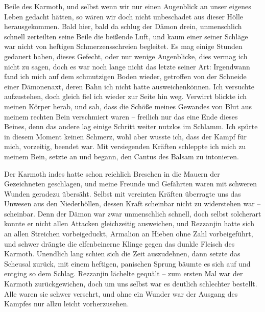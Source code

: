 Beile des Karmoth, und selbst wenn wir nur einen Augenblick an unser eigenes Leben gedacht hätten, so wären wir doch nicht unbeschadet aus dieser Hölle herausgekommen. Bald hier, bald da schlug der Dämon drein, unmenschlich schnell zerteilten seine Beile die beißende Luft, und kaum einer seiner Schläge war nicht von heftigen Schmerzensschreien begleitet. Es mag einige Stunden gedauert haben, dieses Gefecht, oder nur wenige Augenblicke, dies vermag ich nicht zu sagen, doch es war noch lange nicht das letzte seiner Art: Irgendwann fand ich mich auf dem schmutzigen Boden wieder, getroffen von der Schneide einer Dämonenaxt, deren Bahn ich nicht hatte ausweichenkönnen. Ich versuchte aufzustehen, doch gleich fiel ich wieder zur Seite hin weg. Verwirrt blickte ich meinen Körper herab, und sah, dass die Schöße meines Gewandes von Blut aus meinem rechten Bein verschmiert waren -- freilich nur das eine Ende dieses Beines, denn das andere lag einige Schritt weiter nutzlos im Schlamm. Ich spürte in diesem Moment keinen Schmerz, wohl aber wusste ich, dass der Kampf für mich, vorzeitig, beendet war. Mit versiegenden Kräften schleppte ich mich zu meinem Bein, setzte an und begann, den Cantus des Balsam zu intonieren.

Der Karmoth indes hatte schon reichlich Breschen in die Mauern der Gezeichneten geschlagen, und meine Freunde und Gefährten waren mit schweren Wunden geradezu übersäht. Selbst mit vereinten Kräften überragte uns das Unwesen aus den Niederhöllen, dessen Kraft scheinbar nicht zu widerstehen war -- scheinbar. Denn der Dämon war zwar unmenschlich schnell, doch selbst solcherart konnte er nicht allen Attacken gleichzeitig ausweichen, und Rezzanjin hatte sich an allen Streichen vorbeigeduckt, Armalion an Hieben ohne Zahl vorbeigeführt, und schwer drängte die elfenbeinerne Klinge gegen das dunkle Fleisch des Karmoth. Unendlich lang schien sich die Zeit auszudehnen, dann setzte das Scheusal zurück, mit einem heftigen, panischen Sprung bäumte es sich auf und entging so dem Schlag. Rezzanjin lächelte gequält -- zum ersten Mal war der Karmoth zurückgewichen, doch um uns selbst war es deutlich schlechter bestellt. Alle waren sie schwer versehrt, und ohne ein Wunder war der Ausgang des Kampfes nur allzu leicht vorherzusehen.

